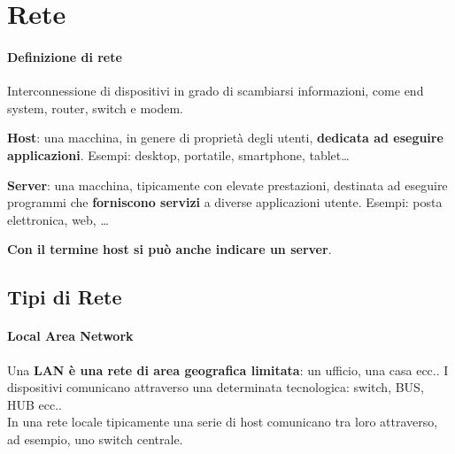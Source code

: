 \documentclass[10pt]{article}
\begin{document}
\section{Rete}
\paragraph{Definizione di rete} Interconnessione di dispositivi in grado di scambiarsi informazioni, come end system, router, switch e modem.\\
\begin{list}{}{Gli end system possono essere di due tipi:}
\item \textbf{Host}: una macchina, in genere di proprietà degli utenti, \textbf{dedicata ad eseguire applicazioni}. Esempi: desktop, portatile, smartphone, tablet\ldots
\item \textbf{Server}: una macchina, tipicamente con elevate prestazioni, destinata ad eseguire programmi che \textbf{forniscono servizi} a diverse applicazioni utente. Esempi: posta elettronica, web, \ldots
\end{list}
\textbf{Con il termine host si può anche indicare un server}.

\subsection{Tipi di Rete}
\paragraph{Local Area Network} Una \textbf{LAN è una rete di area geografica limitata}: un ufficio, una casa ecc.. I dispositivi comunicano attraverso una determinata tecnologica: switch, BUS, HUB ecc..\\
In una rete locale tipicamente una serie di host comunicano tra loro attraverso, ad esempio, uno switch centrale.
\end{document}
